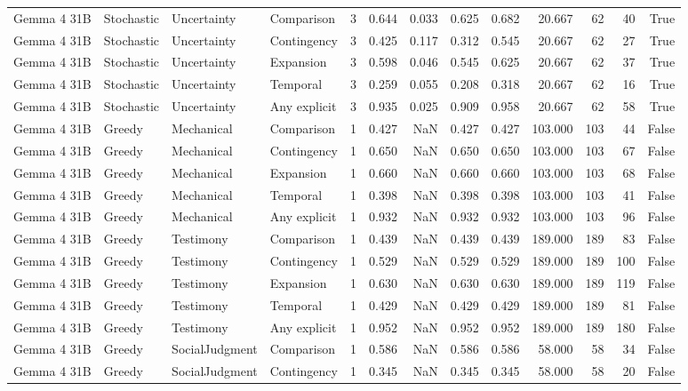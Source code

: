 \begin{tabular}{llllrrrrrrrrr}
Gemma 4 31B & Stochastic & Uncertainty & Comparison & 3 & 0.644 & 0.033 & 0.625 & 0.682 & 20.667 & 62 & 40 & True \\
Gemma 4 31B & Stochastic & Uncertainty & Contingency & 3 & 0.425 & 0.117 & 0.312 & 0.545 & 20.667 & 62 & 27 & True \\
Gemma 4 31B & Stochastic & Uncertainty & Expansion & 3 & 0.598 & 0.046 & 0.545 & 0.625 & 20.667 & 62 & 37 & True \\
Gemma 4 31B & Stochastic & Uncertainty & Temporal & 3 & 0.259 & 0.055 & 0.208 & 0.318 & 20.667 & 62 & 16 & True \\
Gemma 4 31B & Stochastic & Uncertainty & Any explicit & 3 & 0.935 & 0.025 & 0.909 & 0.958 & 20.667 & 62 & 58 & True \\
Gemma 4 31B & Greedy & Mechanical & Comparison & 1 & 0.427 & NaN & 0.427 & 0.427 & 103.000 & 103 & 44 & False \\
Gemma 4 31B & Greedy & Mechanical & Contingency & 1 & 0.650 & NaN & 0.650 & 0.650 & 103.000 & 103 & 67 & False \\
Gemma 4 31B & Greedy & Mechanical & Expansion & 1 & 0.660 & NaN & 0.660 & 0.660 & 103.000 & 103 & 68 & False \\
Gemma 4 31B & Greedy & Mechanical & Temporal & 1 & 0.398 & NaN & 0.398 & 0.398 & 103.000 & 103 & 41 & False \\
Gemma 4 31B & Greedy & Mechanical & Any explicit & 1 & 0.932 & NaN & 0.932 & 0.932 & 103.000 & 103 & 96 & False \\
Gemma 4 31B & Greedy & Testimony & Comparison & 1 & 0.439 & NaN & 0.439 & 0.439 & 189.000 & 189 & 83 & False \\
Gemma 4 31B & Greedy & Testimony & Contingency & 1 & 0.529 & NaN & 0.529 & 0.529 & 189.000 & 189 & 100 & False \\
Gemma 4 31B & Greedy & Testimony & Expansion & 1 & 0.630 & NaN & 0.630 & 0.630 & 189.000 & 189 & 119 & False \\
Gemma 4 31B & Greedy & Testimony & Temporal & 1 & 0.429 & NaN & 0.429 & 0.429 & 189.000 & 189 & 81 & False \\
Gemma 4 31B & Greedy & Testimony & Any explicit & 1 & 0.952 & NaN & 0.952 & 0.952 & 189.000 & 189 & 180 & False \\
Gemma 4 31B & Greedy & SocialJudgment & Comparison & 1 & 0.586 & NaN & 0.586 & 0.586 & 58.000 & 58 & 34 & False \\
Gemma 4 31B & Greedy & SocialJudgment & Contingency & 1 & 0.345 & NaN & 0.345 & 0.345 & 58.000 & 58 & 20 & False \\

\end{tabular}
